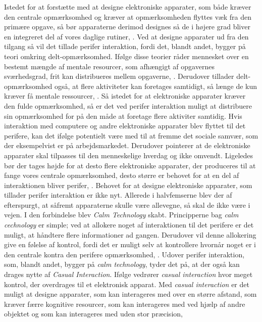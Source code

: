 Istedet for at forstætte med at designe elektroniske apparater, som både kræver den centrale opmærksomhed og kræver at opmærksomheden flyttes væk fra den primære opgave, så bør apparaterne derimod designes så de i højere grad bliver en integreret del af vores daglige rutiner, \parencite[s. 239]{PDF:PICharacteristicsAndConsiderations}. Ved at designe apparater ud fra den tilgang så vil det tillade perifer interaktion, fordi det, blandt andet, bygger på teori omkring delt-opmærksomhed. Ifølge disse teorier råder mennesket over en bestemt mængde af mentale resourcer, som afhængigt af opgavernes sværhedsgrad, frit kan distribueres mellem opgaverne, \parencite[s. 240]{PDF:PICharacteristicsAndConsiderations}. Derudover tillader delt-opmærksomhed også, at flere aktiviteter kan foretages samtidigt, så længe de kun kræver få mentale ressourcer, \parencite[s. 2]{PDF:FacilitatingPIDesignAndEvaluation}. Så istedet for at elektroniske apparater kræver den fulde opmærksomhed, så er det ved perifer interaktion muligt at distribuere sin opmærksomhed for på den måde at foretage flere aktiviter samtidig. Hvis interaktion med computere og andre elektroniske apparater blev flyttet til det perifere, kan det ifølge \textcite[s. 11]{PDF:TheComputerWeiser} potentielt være med til at fremme det sociale samvær, som der eksempelvist er på arbejdsmarkedet. Derudover pointerer \textcite[s. 11]{PDF:TheComputerWeiser} at de elektroniske apparater skal tilpasses til den menneskelige hverdag og ikke omvendt. Ligeledes bør der tages højde for at desto flere elektroniske apparater, der produceres til at fange vores centrale opmærksomhed, desto større er behovet for at en del af interaktionen bliver perifer, \parencite[s. 240]{PDF:PICharacteristicsAndConsiderations}. \blankline
%
Behovet for at designe elektroniske apparater, som tillader perifer interaktion er ikke nyt. Allerede i halvfemserne blev der af \textcite[s. 3]{PDF:TheComingAgeOfCalmTech} efterspurgt, at såfremt apparaterne skulle være allevegne, så skal de ikke være i vejen. I den forbindelse blev \textit{Calm Technology} skabt. Principperne bag \textit{calm cechnology} er simple; ved at allokere noget af interaktionen til det perifere er det muligt, at håndtere flere informationer ad gangen. Derudover vil denne allokering give en følelse af kontrol, fordi det er muligt selv at kontrollere hvornår noget er i den centrale kontra den perifere opmærksomhed, \parencite[s. 4]{PDF:TheComingAgeOfCalmTech}. Udover perifer interaktion, som, blandt andet, bygger på \textit{calm technology}, tyder det på, at der også kan drages nytte af \textit{Casual Interaction}. Ifølge \textcite[ss. 118-119]{PDF:PeripheralInteraction} vedrører \textit{casual interaction} hvor meget kontrol, der overdrages til et elektronisk apparat. Med \textit{casual interaction} er det muligt at designe apparater, som kan interageres med over en større afstand, som kræver færre kognitive resourcer, som kan interageres med ved hjælp af andre objektet og som kan interageres med uden stor præcision, \parencite[s. 128]{PDF:PeripheralInteraction}        
